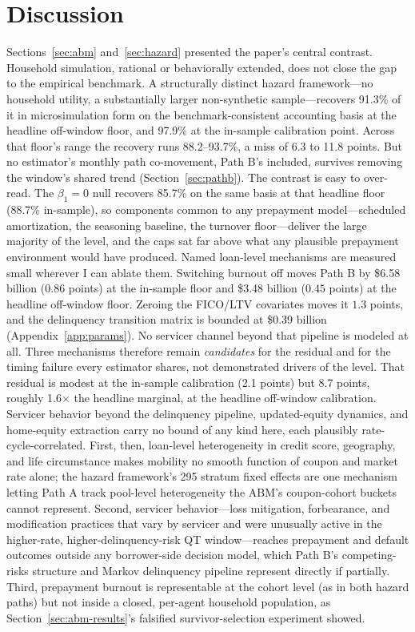 \documentclass[12pt]{article}
\begin{document}
\section{Discussion}\label{sec:discussion}

Sections~\ref{sec:abm} and~\ref{sec:hazard} presented the paper's central contrast. Household simulation, rational or behaviorally extended, does not close the gap to the empirical benchmark. A structurally distinct hazard framework---no household utility, a substantially larger non-synthetic sample---recovers 91.3\% of it in microsimulation form on the benchmark-consistent accounting basis at the headline off-window floor, and 97.9\% at the in-sample calibration point. Across that floor's range the recovery runs 88.2--93.7\%, a miss of 6.3 to 11.8 points. But no estimator's monthly path co-movement, Path B's included, survives removing the window's shared trend (Section~\ref{sec:pathb}). The contrast is easy to over-read. The $\beta_1 = 0$ null recovers 85.7\% on the same basis at that headline floor (88.7\% in-sample), so components common to any prepayment model---scheduled amortization, the seasoning baseline, the turnover floor---deliver the large majority of the level, and the caps sat far above what any plausible prepayment environment would have produced. Named loan-level mechanisms are measured small wherever I can ablate them. Switching burnout off moves Path B by \$6.58 billion ($0.86$ points) at the in-sample floor and \$3.48 billion ($0.45$ points) at the headline off-window floor. Zeroing the FICO/LTV covariates moves it $1.3$ points, and the delinquency transition matrix is bounded at \$0.39 billion (Appendix~\ref{app:params}). No servicer channel beyond that pipeline is modeled at all. Three mechanisms therefore remain \emph{candidates} for the residual and for the timing failure every estimator shares, not demonstrated drivers of the level. That residual is modest at the in-sample calibration (2.1 points) but 8.7 points, roughly 1.6$\times$ the headline marginal, at the headline off-window calibration. Servicer behavior beyond the delinquency pipeline, updated-equity dynamics, and home-equity extraction carry no bound of any kind here, each plausibly rate-cycle-correlated. First, then, loan-level heterogeneity in credit score, geography, and life circumstance makes mobility no smooth function of coupon and market rate alone; the hazard framework's 295 stratum fixed effects are one mechanism letting Path A track pool-level heterogeneity the ABM's coupon-cohort buckets cannot represent. Second, servicer behavior---loss mitigation, forbearance, and modification practices that vary by servicer and were unusually active in the higher-rate, higher-delinquency-risk QT window---reaches prepayment and default outcomes outside any borrower-side decision model, which Path B's competing-risks structure and Markov delinquency pipeline represent directly if partially. Third, prepayment burnout is representable at the cohort level (as in both hazard paths) but not inside a closed, per-agent household population, as Section~\ref{sec:abm-results}'s falsified survivor-selection experiment showed.
\end{document}
